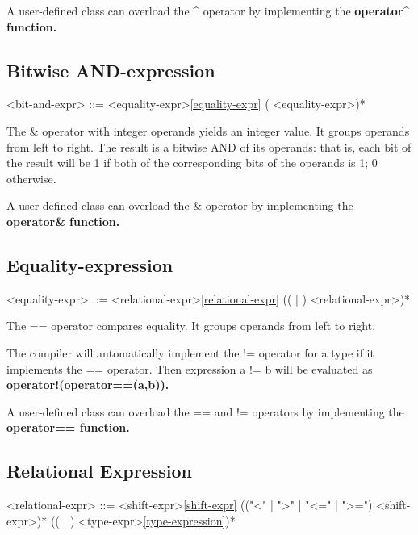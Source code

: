 \documentclass[a4paper,oneside,11pt]{article}
\begin{document}
A user-defined class can overload the \^{} operator by implementing the \bf{operator\^{}} function.

\subsection{Bitwise AND-expression}

\begin{grammar}
\label{bit-and-expr}<bit-and-expr> ::= <equality-expr>\ref{equality-expr} (\lit*{\&} <equality-expr>)*
\end{grammar}

The \& operator with integer operands yields an integer value. It groups operands from left to right.
The result is a bitwise AND of its operands:
that is, each bit of the result will be 1 if both of the corresponding bits of the operands is 1; 0 otherwise.

A user-defined class can overload the \& operator by implementing the \bf{operator\&} function.

\subsection{Equality-expression}

\begin{grammar}
\label{equality-expr}<equality-expr> ::= <relational-expr>\ref{relational-expr} ((\lit*{==} | \lit*{!=}) <relational-expr>)*
\end{grammar}

The == operator compares equality. It groups operands from left to right.

The compiler will automatically implement the != operator for a type if it implements the == operator.
Then expression a != b will be evaluated as \bf{operator!(operator==(a,b))}.

A user-defined class can overload the == and != operators by implementing the \bf{operator==} function.

\subsection{Relational Expression}

\begin{grammar}
\label{relational-expr}<relational-expr> ::= <shift-expr>\ref{shift-expr} (("<" | ">" | "<=" | ">=") <shift-expr>)*
 (( | ) <type-expr>\ref{type-expression})*
\end{grammar}
\end{document}
